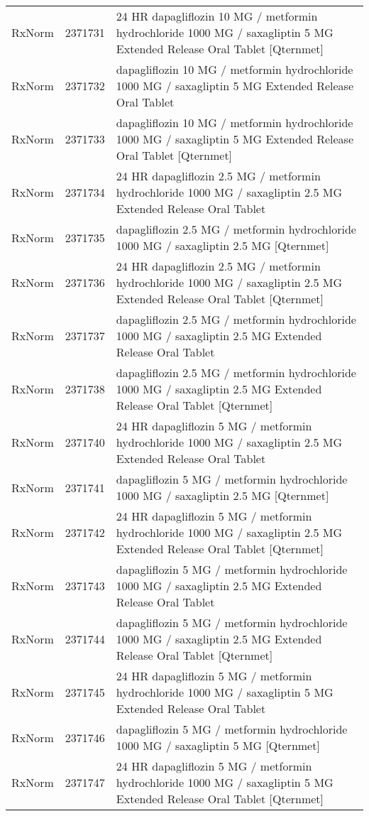\begin{longtable}{p{}p{}p{}}
  RxNorm & 2371731 & 24 HR dapagliflozin 10 MG / metformin hydrochloride 1000 MG / saxagliptin 5 MG Extended Release Oral Tablet [Qternmet] \\ 
  RxNorm & 2371732 & dapagliflozin 10 MG / metformin hydrochloride 1000 MG / saxagliptin 5 MG Extended Release Oral Tablet \\ 
  RxNorm & 2371733 & dapagliflozin 10 MG / metformin hydrochloride 1000 MG / saxagliptin 5 MG Extended Release Oral Tablet [Qternmet] \\ 
  RxNorm & 2371734 & 24 HR dapagliflozin 2.5 MG / metformin hydrochloride 1000 MG / saxagliptin 2.5 MG Extended Release Oral Tablet \\ 
  RxNorm & 2371735 & dapagliflozin 2.5 MG / metformin hydrochloride 1000 MG / saxagliptin 2.5 MG [Qternmet] \\ 
  RxNorm & 2371736 & 24 HR dapagliflozin 2.5 MG / metformin hydrochloride 1000 MG / saxagliptin 2.5 MG Extended Release Oral Tablet [Qternmet] \\ 
  RxNorm & 2371737 & dapagliflozin 2.5 MG / metformin hydrochloride 1000 MG / saxagliptin 2.5 MG Extended Release Oral Tablet \\ 
  RxNorm & 2371738 & dapagliflozin 2.5 MG / metformin hydrochloride 1000 MG / saxagliptin 2.5 MG Extended Release Oral Tablet [Qternmet] \\ 
  RxNorm & 2371740 & 24 HR dapagliflozin 5 MG / metformin hydrochloride 1000 MG / saxagliptin 2.5 MG Extended Release Oral Tablet \\ 
  RxNorm & 2371741 & dapagliflozin 5 MG / metformin hydrochloride 1000 MG / saxagliptin 2.5 MG [Qternmet] \\ 
  RxNorm & 2371742 & 24 HR dapagliflozin 5 MG / metformin hydrochloride 1000 MG / saxagliptin 2.5 MG Extended Release Oral Tablet [Qternmet] \\ 
  RxNorm & 2371743 & dapagliflozin 5 MG / metformin hydrochloride 1000 MG / saxagliptin 2.5 MG Extended Release Oral Tablet \\ 
  RxNorm & 2371744 & dapagliflozin 5 MG / metformin hydrochloride 1000 MG / saxagliptin 2.5 MG Extended Release Oral Tablet [Qternmet] \\ 
  RxNorm & 2371745 & 24 HR dapagliflozin 5 MG / metformin hydrochloride 1000 MG / saxagliptin 5 MG Extended Release Oral Tablet \\ 
  RxNorm & 2371746 & dapagliflozin 5 MG / metformin hydrochloride 1000 MG / saxagliptin 5 MG [Qternmet] \\ 
  RxNorm & 2371747 & 24 HR dapagliflozin 5 MG / metformin hydrochloride 1000 MG / saxagliptin 5 MG Extended Release Oral Tablet [Qternmet] \\ 

\end{longtable}
